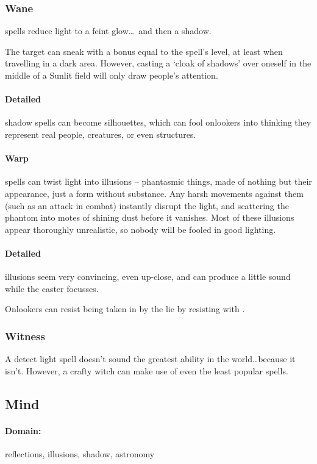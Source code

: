 \begin{multicols}{2}
\subsubsection{Wane}
spells reduce light to a feint glow\ldots~and then a shadow.

The target can sneak with a bonus equal to the spell's level, at least when travelling in a dark area.
However, casting a `cloak of shadows' over oneself in the middle of a Sunlit field will only draw people's attention.

\paragraph{Detailed}
shadow spells can become silhouettes, which can fool onlookers into thinking they represent real people, creatures, or even structures.

\paragraph{Warp}
spells can twist light into illusions -- phantasmic things, made of nothing but their appearance, just a form without substance.
Any harsh movements against them (such as an attack in combat) instantly disrupt the light, and scattering the phantom into motes of shining dust before it vanishes.
Most of these illusions appear thoroughly unrealistic, so nobody will be fooled in good lighting.

\paragraph{Detailed}
illusions seem very convincing, even up-close, and can produce a little sound while the caster focusses.

Onlookers can resist being taken in by the lie by resisting with .

\subsubsection{Witness}
A detect light spell doesn't sound the greatest ability in the world\ldots because it isn't.
However, a crafty witch can make use of even the least popular spells.

\subsection{Mind}
\paragraph{Domain:}
reflections, illusions, shadow, astronomy


\end{multicols}
